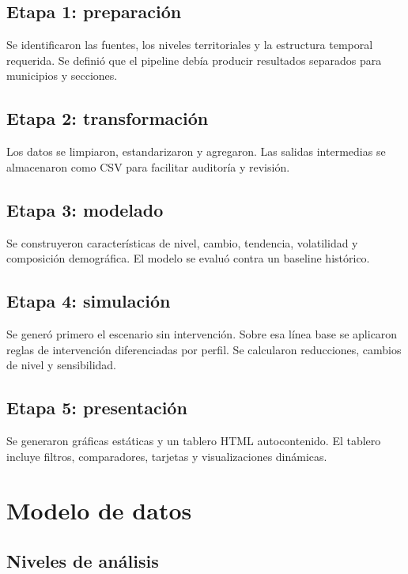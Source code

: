 \documentclass[11pt,a4paper]{article}
\begin{document}
\subsection{Etapa 1: preparación}

Se identificaron las fuentes, los niveles territoriales y la estructura temporal requerida. Se definió que el pipeline debía producir resultados separados para municipios y secciones.

\subsection{Etapa 2: transformación}

Los datos se limpiaron, estandarizaron y agregaron. Las salidas intermedias se almacenaron como CSV para facilitar auditoría y revisión.

\subsection{Etapa 3: modelado}

Se construyeron características de nivel, cambio, tendencia, volatilidad y composición demográfica. El modelo se evaluó contra un baseline histórico.

\subsection{Etapa 4: simulación}

Se generó primero el escenario sin intervención. Sobre esa línea base se aplicaron reglas de intervención diferenciadas por perfil. Se calcularon reducciones, cambios de nivel y sensibilidad.

\subsection{Etapa 5: presentación}

Se generaron gráficas estáticas y un tablero HTML autocontenido. El tablero incluye filtros, comparadores, tarjetas y visualizaciones dinámicas.

\section{Modelo de datos}

\subsection{Niveles de análisis}
\end{document}
